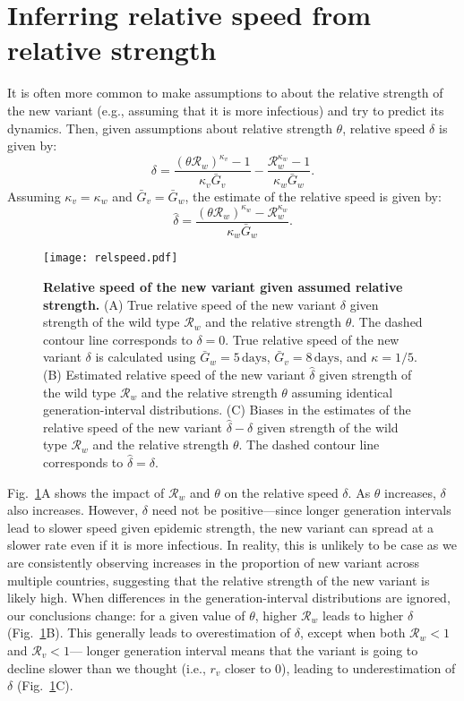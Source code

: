 \documentclass[12pt]{article}
\newcommand{\fref}[1]{Fig.~\ref{fig:#1}}
\newcommand{\RR}{\ensuremath{{\mathcal R}}\xspace}
\begin{document}
\section{Inferring relative speed from relative strength}

It is often more common to make assumptions to about the relative strength of the new variant (e.g., assuming that it is more infectious) and try to predict its dynamics.
Then, given assumptions about relative strength $\theta$, relative speed $\delta$ is given by:
\begin{equation}
\delta = \frac{(\theta \RR_w)^{\kappa_v} - 1}{\kappa_v \bar{G}_v} - \frac{\RR_w^{\kappa_w} - 1}{\kappa_w \bar{G}_w}.
\end{equation}
Assuming $\kappa_v = \kappa_w$ and $\bar{G}_v = \bar{G}_w$, the estimate of the relative speed is given by:
\begin{equation}
\hat{\delta} = \frac{(\theta \RR_w)^{\kappa_w} - \RR_w^{\kappa_w}}{\kappa_w \bar{G}_w}.
\end{equation}


\begin{figure}[!th]
\texttt{[image: relspeed.pdf]}
\caption{
\textbf{Relative speed of the new variant given assumed relative strength.}
(A) True relative speed of the new variant $\delta$ given strength of the wild type $\RR_w$ and the relative strength $\theta$.
The dashed contour line corresponds to $\delta = 0$.
True relative speed of the new variant $\delta$ is calculated using $\bar{G}_w = 5\,\textrm{days}$, $\bar{G}_v = 8\,\textrm{days}$, and $\kappa = 1/5$. 
(B) Estimated relative speed of the new variant $\hat{\delta}$ given strength of the wild type $\RR_w$ and the relative strength $\theta$ assuming identical generation-interval distributions.
(C) Biases in the estimates of the relative speed of the new variant $\hat{\delta} - \delta$ given strength of the wild type $\RR_w$ and the relative strength $\theta$.
The dashed contour line corresponds to $\hat{\delta} = \delta$.
}
\label{fig:relspeed}
\end{figure}

\fref{relspeed}A shows the impact of $\RR_w$ and $\theta$ on the relative speed $\delta$.
As $\theta$ increases, $\delta$ also increases.
However, $\delta$ need not be positive---since longer generation intervals lead to slower speed given epidemic strength, the new variant can spread at a slower rate even if it is more infectious.
In reality, this is unlikely to be case as we are consistently observing increases in the proportion of new variant across multiple countries, suggesting that the relative strength of the new variant is likely high.
When differences in the generation-interval distributions are ignored, our conclusions change: for a given value of $\theta$, higher $\RR_w$ leads to higher $\delta$ (\fref{relspeed}B).
This generally leads to overestimation of $\delta$, except when both $\RR_w < 1$ and $\RR_v < 1$---
longer generation interval means that the variant is going to decline slower than we thought (i.e., $r_v$ closer to 0), leading to underestimation of $\delta$ (\fref{relspeed}C).
\end{document}
